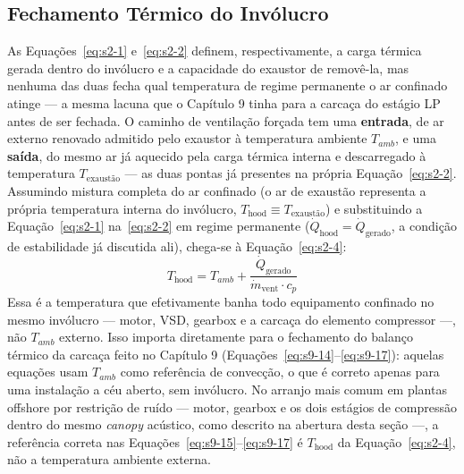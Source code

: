 \documentclass[12pt,a4paper]{article}
\numberwithin{equation}{section}
\numberwithin{table}{section}
\numberwithin{figure}{section}
\begin{document}
	\subsection{\textbf{Fechamento Térmico do Invólucro}}
	As Equações~\eqref{eq:s2-1} e~\eqref{eq:s2-2} definem, respectivamente, a carga térmica gerada dentro do invólucro e a capacidade do exaustor de removê-la, mas nenhuma das duas fecha qual temperatura de regime permanente o ar confinado atinge — a mesma lacuna que o Capítulo 9 tinha para a carcaça do estágio LP antes de ser fechada. O caminho de ventilação forçada tem uma \textbf{entrada}, de ar externo renovado admitido pelo exaustor à temperatura ambiente $T_{amb}$, e uma \textbf{saída}, do mesmo ar já aquecido pela carga térmica interna e descarregado à temperatura $T_{\text{exaustão}}$ — as duas pontas já presentes na própria Equação~\eqref{eq:s2-2}. Assumindo mistura completa do ar confinado (o ar de exaustão representa a própria temperatura interna do invólucro, $T_{\text{hood}} \equiv T_{\text{exaustão}}$) e substituindo a Equação~\eqref{eq:s2-1} na~\eqref{eq:s2-2} em regime permanente ($\dot Q_{\text{hood}} = \dot Q_{\text{gerado}}$, a condição de estabilidade já discutida ali), chega-se à Equação~\eqref{eq:s2-4}:
	\begin{equation}\label{eq:s2-4}
 T_{\text{hood}} = T_{amb} + \frac{\dot{Q}_{\text{gerado}}}{\dot{m}_{\text{vent}} \cdot c_p}
\end{equation}
	Essa é a temperatura que efetivamente banha todo equipamento confinado no mesmo invólucro — motor, VSD, gearbox e a carcaça do elemento compressor —, não $T_{amb}$ externo. Isso importa diretamente para o fechamento do balanço térmico da carcaça feito no Capítulo 9 (Equações~\eqref{eq:s9-14}--\eqref{eq:s9-17}): aquelas equações usam $T_{amb}$ como referência de convecção, o que é correto apenas para uma instalação a céu aberto, sem invólucro. No arranjo mais comum em plantas offshore por restrição de ruído — motor, gearbox e os dois estágios de compressão dentro do mesmo \textit{canopy} acústico, como descrito na abertura desta seção —, a referência correta nas Equações~\eqref{eq:s9-15}--\eqref{eq:s9-17} é $T_{\text{hood}}$ da Equação~\eqref{eq:s2-4}, não a temperatura ambiente externa.
\end{document}
